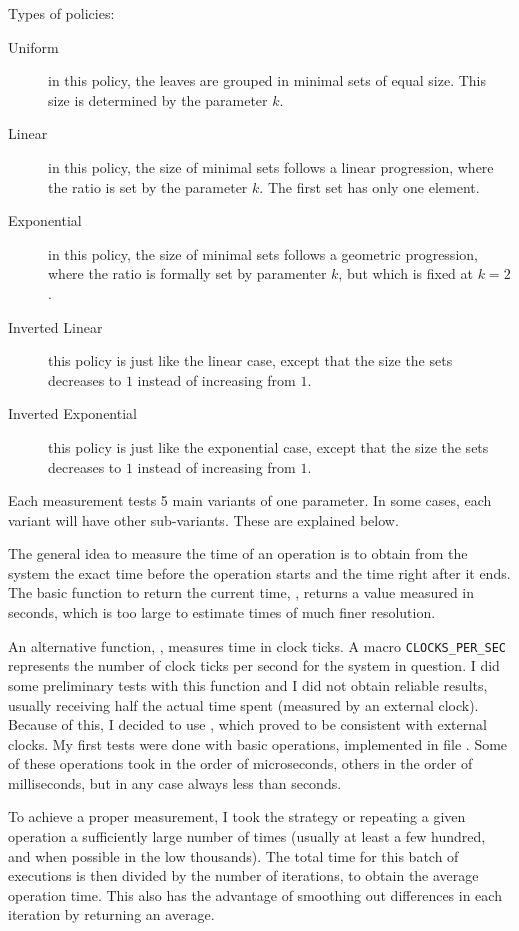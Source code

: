 \documentclass{article}
\begin{document}
Types of policies:
\begin{description}
\item[Uniform] in this policy, the leaves are grouped in minimal sets of equal size. This size is determined by the parameter $k$. 
\item[Linear] in this policy, the size of minimal sets follows a linear progression, where the ratio is set by the parameter $k$. The first set has only one element.
\item[Exponential] in this policy, the size of minimal sets follows a geometric progression, where the ratio is formally set by paramenter $k$, but which is fixed at $k=2$. 
\item[Inverted Linear] this policy is just like the linear case, except that the size the sets decreases to $1$ instead of increasing from $1$.
\item[Inverted Exponential] this policy is just like the exponential case, except that the size the sets decreases to $1$ instead of increasing from $1$.
\end{description}

Each measurement tests 5 main variants of one parameter. In some cases, each variant will have other sub-variants. These are explained below.

The general idea to measure the time of an operation is to obtain from the system the exact time before the operation starts and the time right after it ends. The basic function to return the current time, , returns a value measured in seconds, which is too large to estimate times of much finer resolution. 

An alternative function, , measures time in clock ticks. A macro \verb|CLOCKS_PER_SEC| represents the number of clock ticks per second for the system in question. I did some preliminary tests with this function and I did not obtain reliable results, usually receiving half the actual time spent (measured by an external clock). Because of this, I decided to use , which proved to be consistent with external clocks. My first tests were done with basic operations, implemented in file . Some of these operations took in the order of microseconds, others in the order of milliseconds, but in any case always less than seconds. 

To achieve a proper measurement, I took the strategy or repeating a given operation a sufficiently large number of times (usually at least a few hundred, and when possible in the low thousands). The total time for this batch of executions is then divided by the number of iterations, to obtain the average operation time. This also has the advantage of smoothing out differences in each iteration by returning an average.
\end{document}

